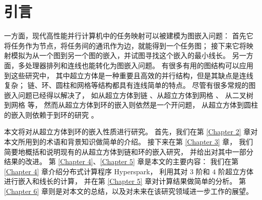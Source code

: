 
\chapter{引言}
\label{Chapter 1}

一方面，现代高性能并行计算机中的任务映射可以被建模为图嵌入问题：
首先它将任务作为节点，将任务间的通讯作为边，就能得到一个任务图；
接下来它将映射模拟为从一个图到另一个图的嵌入，并试图寻找这个嵌入的最小线长。
另一方面，多处理器排列和连线也能转化为图嵌入问题。
有很多有用的图结构可以应用到这些研究中，
其中超立方体是一种重要且高效的并行结构，但是其缺点是连线复杂；
链、环、圆柱和网格等结构都具有连线简单的特点。
尽管有很多常规的图嵌入问题已经得以解决了，
如从超立方体到链 \cite{Harper.1964}、从超立方体到网格 \cite{Manuel.2009}、
从二叉树到网格 \cite{Opatrny.2000} 等，
然而从超立方体到环的嵌入则依然是一个开问题，
从超立方体到圆柱的嵌入则依赖于到环的研究 \cite{Ji.2015}。

本文将对从超立方体到环的嵌入性质进行研究。
首先，我们在第 \ref{Chapter 2} 章对本文所用到的术语和背景知识做简单的介绍。
接下来在第 \ref{Chapter 3} 章，
我们简要地概括和说明现有的从超立方体到链和环的嵌入研究，
并给出对其中一部分结果的改进。
第 \ref{Chapter 4}、\ref{Chapter 5} 章是本文的主要内容：
我们在第 \ref{Chapter 4} 章介绍分布式计算程序 Hyperspark，
利用其对 $3$ 阶和 $4$ 阶超立方体进行嵌入和线长的计算，
并在第 \ref{Chapter 5} 章对计算结果做简单的分析。
第 \ref{Chapter 6} 章则是对本文的总结，以及对未来在该研究领域进一步工作的展望。

